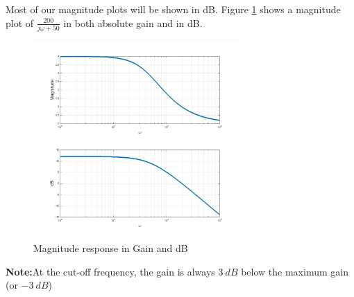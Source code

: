 \documentclass{handout}
\begin{document}
Most of our magnitude plots will be shown in dB.  Figure \ref{fig: dB} shows a magnitude plot of $\frac{200}{j\omega+50}$ in both absolute gain and in dB.
\begin{figure} [h!]
\centering
\includegraphics[width=0.7\textwidth]{dB.jpg}
\caption{Magnitude response in Gain and dB}
\label{fig: dB}
\end{figure}

\textbf{Note:}At the cut-off frequency, the gain is always $3\ dB$ below the maximum gain (or $-3\ dB$)

\newpage
\clearpage
\pagebreak

\newpage
\clearpage
\pagebreak

\newpage
\clearpage
\pagebreak

\newpage
\clearpage
\pagebreak

\newpage
\clearpage
\pagebreak

\newpage
\clearpage
\pagebreak
\end{document}
